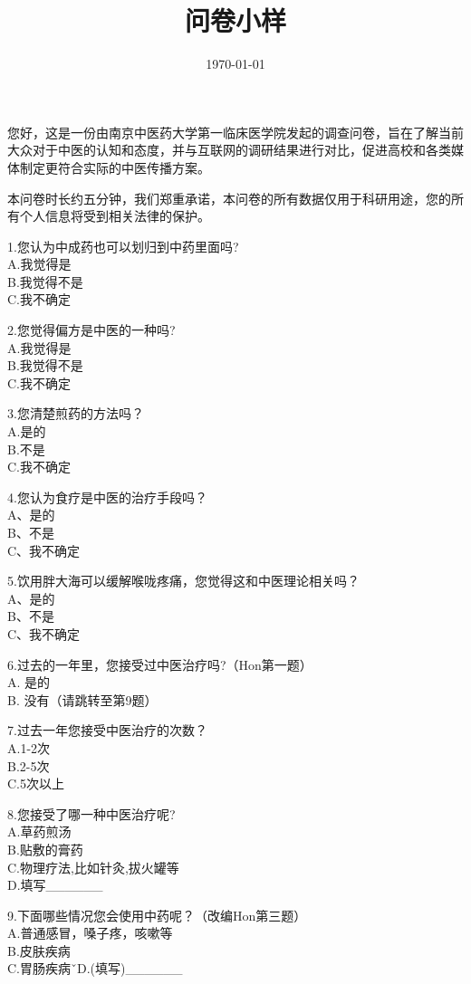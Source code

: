 \documentclass{ctexart}
\title{问卷小样}
\date{\today}
\begin{document}
	\maketitle
您好，这是一份由南京中医药大学第一临床医学院发起的调查问卷，旨在了解当前大众对于中医的认知和态度，并与互联网的调研结果进行对比，促进高校和各类媒体制定更符合实际的中医传播方案。

本问卷时长约五分钟，我们郑重承诺，本问卷的所有数据仅用于科研用途，您的所有个人信息将受到相关法律的保护。

\begin{spacing}{1.5}
\noindent
1.您认为中成药也可以划归到中药里面吗?\\
A.我觉得是\\
B.我觉得不是\\
C.我不确定

\noindent
2.您觉得偏方是中医的一种吗?\\
A.我觉得是\\
B.我觉得不是\\
C.我不确定

\noindent
3.您清楚煎药的方法吗？\\
A.是的\\
B.不是\\
C.我不确定

\noindent
4.您认为食疗是中医的治疗手段吗？\\
A、是的\\
B、不是\\
C、我不确定

\noindent
5.饮用胖大海可以缓解喉咙疼痛，您觉得这和中医理论相关吗？\\
A、是的\\
B、不是\\
C、我不确定

\noindent
6.过去的一年里，您接受过中医治疗吗?（Hon第一题）\\
A. 是的\\
B. 没有（请跳转至第9题）

\noindent
7.过去一年您接受中医治疗的次数？\\
A.1-2次\\
B.2-5次\\
C.5次以上

\noindent
8.您接受了哪一种中医治疗呢?\\
A.草药煎汤\\
B.贴敷的膏药\\
C.物理疗法,比如针灸,拔火罐等\\
D.填写______

\noindent
9.下面哪些情况您会使用中药呢？（改编Hon第三题）\\
A.普通感冒，嗓子疼，咳嗽等\\
B.皮肤疾病\\
C.胃肠疾病\v\
D.(填写)______


\end{spacing}
\end{document}
